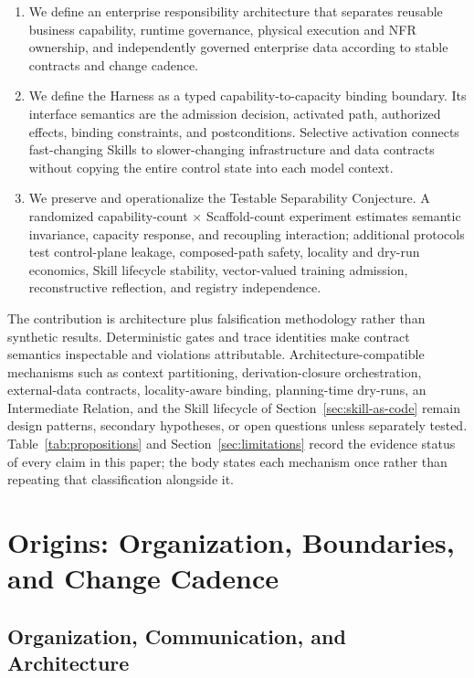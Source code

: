 \begin{enumerate}
\item We define an enterprise responsibility architecture that separates reusable business capability, runtime governance, physical execution and NFR ownership, and independently governed enterprise data according to stable contracts and change cadence.
\item We define the Harness as a typed capability-to-capacity binding boundary. Its interface semantics are the admission decision, activated path, authorized effects, binding constraints, and postconditions. Selective activation connects fast-changing Skills to slower-changing infrastructure and data contracts without copying the entire control state into each model context.
\item We preserve and operationalize the Testable Separability Conjecture. A randomized capability-count $\times$ Scaffold-count experiment estimates semantic invariance, capacity response, and recoupling interaction; additional protocols test control-plane leakage, composed-path safety, locality and dry-run economics, Skill lifecycle stability, vector-valued training admission, reconstructive reflection, and registry independence.
\end{enumerate}

The contribution is architecture plus falsification methodology rather than synthetic results. Deterministic gates and trace identities make contract semantics inspectable and violations attributable. Architecture-compatible mechanisms such as context partitioning, derivation-closure orchestration, external-data contracts, locality-aware binding, planning-time dry-runs, an Intermediate Relation, and the Skill lifecycle of Section~\ref{sec:skill-as-code} remain design patterns, secondary hypotheses, or open questions unless separately tested. Table~\ref{tab:propositions} and Section~\ref{sec:limitations} record the evidence status of every claim in this paper; the body states each mechanism once rather than repeating that classification alongside it.

\section{Origins: Organization, Boundaries, and Change Cadence}
\label{sec:origins}

\subsection{Organization, Communication, and Architecture}

